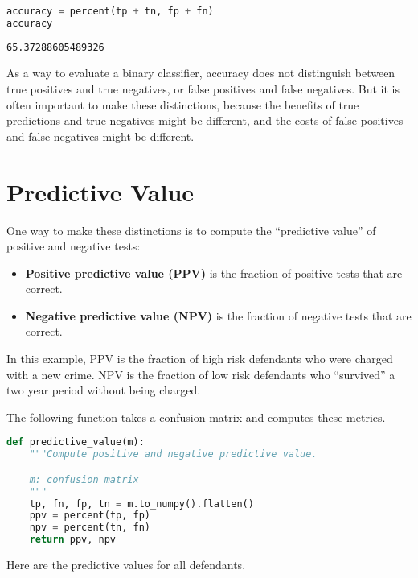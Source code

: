 \begin{lstlisting}[language=Python,style=source]
accuracy = percent(tp + tn, fp + fn)
accuracy
\end{lstlisting}

\begin{lstlisting}[style=output]
65.37288605489326
\end{lstlisting}

As a way to evaluate a binary classifier, accuracy does not distinguish
between true positives and true negatives, or false positives and false
negatives. But it is often important to make these distinctions, because
the benefits of true predictions and true negatives might be different,
and the costs of false positives and false negatives might be different.

\section{Predictive Value}\label{predictive-value}

One way to make these distinctions is to compute the ``predictive
value'' of positive and negative tests:

\begin{itemize}
\item
  \textbf{Positive predictive value (PPV)} is the fraction of positive
  tests that are correct.
\item
  \textbf{Negative predictive value (NPV)} is the fraction of negative
  tests that are correct.
\end{itemize}

In this example, PPV is the fraction of high risk defendants who were
charged with a new crime. NPV is the fraction of low risk defendants who
``survived'' a two year period without being charged.

The following function takes a confusion matrix and computes these
metrics.

\begin{lstlisting}[language=Python,style=source]
def predictive_value(m):
    """Compute positive and negative predictive value.

    m: confusion matrix
    """
    tp, fn, fp, tn = m.to_numpy().flatten()
    ppv = percent(tp, fp)
    npv = percent(tn, fn)
    return ppv, npv
\end{lstlisting}

\pagebreak

Here are the predictive values for all defendants.

